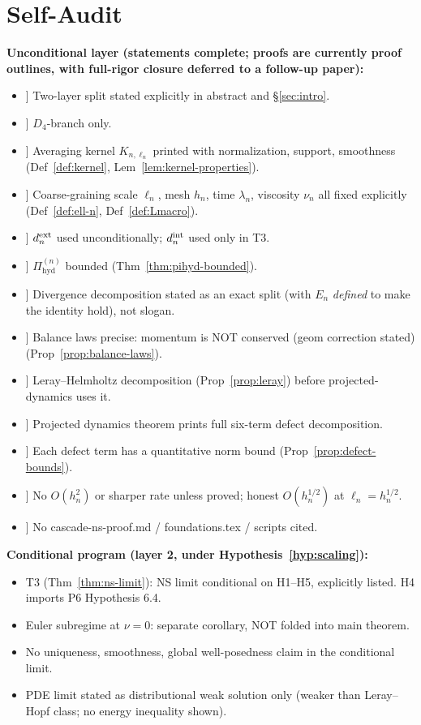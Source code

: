 \documentclass[11pt, a4paper]{amsart}
\theoremstyle{definition}
\newcommand{\Pihyd}{\Pi_{\mathrm{hyd}}}
\begin{document}
\section{Self-Audit}
\label{sec:audit}

\textbf{Unconditional layer (statements complete; proofs are
currently proof outlines, with full-rigor closure deferred to a
follow-up paper):}
\begin{itemize}
\item[[1]] Two-layer split stated explicitly in abstract and
  \S\ref{sec:intro}.
\item[[2]] $D_4$-branch only.
\item[[3]] Averaging kernel $K_{n, \ell_n}$ printed with
  normalization, support, smoothness
  (Def~\ref{def:kernel}, Lem~\ref{lem:kernel-properties}).
\item[[4]] Coarse-graining scale $\ell_n$, mesh $h_n$, time
  $\lambda_n$, viscosity $\nu_n$ all fixed explicitly
  (Def~\ref{def:ell-n}, Def~\ref{def:Lmacro}).
\item[[5]] $d_n^{\rm ext}$ used unconditionally;
  $d_n^{\rm int}$ used only in T3.
\item[[6]] $\Pihyd^{(n)}$ bounded (Thm~\ref{thm:pihyd-bounded}).
\item[[7]] Divergence decomposition stated as an exact split
  (with $E_n$ \emph{defined} to make the identity hold),
  not slogan.
\item[[8]] Balance laws precise: momentum is NOT conserved (geom
  correction stated) (Prop~\ref{prop:balance-laws}).
\item[[9]] Leray--Helmholtz decomposition
  (Prop~\ref{prop:leray}) before projected-dynamics uses it.
\item[[10]] Projected dynamics theorem prints full six-term
  defect decomposition.
\item[[11]] Each defect term has a quantitative norm bound
  (Prop~\ref{prop:defect-bounds}).
\item[[12]] No $O(h_n^2)$ or sharper rate unless proved; honest
  $O(h_n^{1/2})$ at $\ell_n = h_n^{1/2}$.
\item[[13]] No cascade-ns-proof.md / foundations.tex / scripts
  cited.
\end{itemize}

\textbf{Conditional program (layer 2, under
Hypothesis~\ref{hyp:scaling}):}
\begin{itemize}
\item T3 (Thm~\ref{thm:ns-limit}): NS limit conditional on
  H1--H5, explicitly listed. H4 imports P6 Hypothesis 6.4.
\item Euler subregime at $\nu = 0$: separate corollary, NOT
  folded into main theorem.
\item No uniqueness, smoothness, global well-posedness claim in
  the conditional limit.
\item PDE limit stated as distributional weak solution only
  (weaker than Leray--Hopf class; no energy inequality shown).
\end{itemize}
\end{document}

